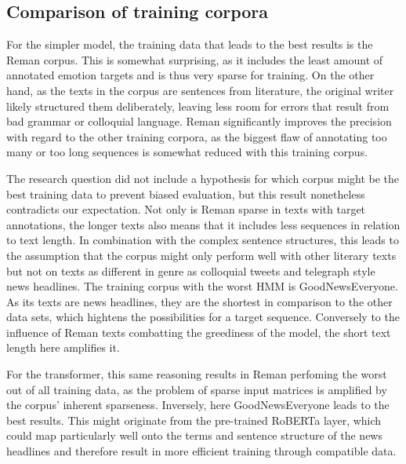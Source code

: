 \documentclass[12pt,pdftex,a4paper]{scrartcl}
\begin{document}
\subsection{Comparison of training corpora}
For the simpler model, the training data that leads to the best results is the Reman corpus. This is somewhat surprising, as it includes the least amount of annotated emotion targets and is thus very sparse for training. On the other hand, as the texts in the corpus are sentences from literature, the original writer likely structured them deliberately, leaving less room for errors that result from bad grammar or colloquial language. Reman significantly improves the precision with regard to the other training corpora, as the biggest flaw of annotating too many or too long sequences is somewhat reduced with this training corpus. 

The research question did not include a hypothesis for which corpus might be the best training data to prevent biased evaluation, but this result nonetheless contradicts our expectation. Not only is Reman sparse in texts with target annotations, the longer texts also means that it includes less sequences in relation to text length. In combination with the complex sentence structures, this leads to the assumption that the corpus might only perform well with other literary texts but not on texts as different in genre as colloquial tweets and telegraph style news headlines. The training corpus with the worst HMM is GoodNewsEveryone. As its texts are news headlines, they are the shortest in comparison to the other data sets, which hightens the possibilities for a target sequence. Conversely to the influence of Reman texts combatting the greediness of the model, the short text length here amplifies it.

For the transformer, this same reasoning results in Reman perfoming the worst out of all training data, as the problem of sparse input matrices is amplified by the corpus' inherent sparseness. Inversely, here GoodNewsEveryone leads to the best results. This might originate from the pre-trained RoBERTa layer, which could map particularly well onto the terms and sentence structure of the news headlines and therefore result in more efficient training through compatible data.
\end{document}
